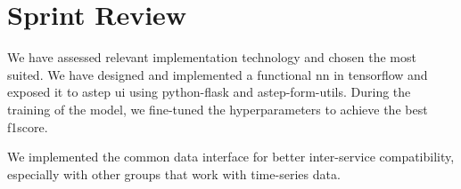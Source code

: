 \section{Sprint Review} \label{sprint_3_review}
We have assessed relevant implementation technology and chosen the most suited. We have designed and implemented a functional \gls{nn} in \gls{tensorflow} and exposed it to \gls{astep} \gls{ui} using python-flask and astep-form-utils. During the training of the model, we fine-tuned the hyperparameters to achieve the best \gls{f1score}.

We implemented the common data interface for better inter-service compatibility, especially with other groups that work with time-series data.